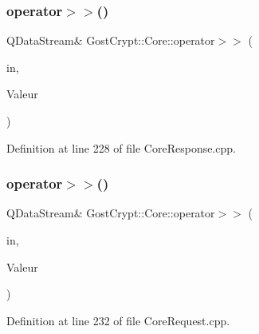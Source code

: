 \mbox{\label{namespace_gost_crypt_1_1_core_a9ba39e6dd3edd665d9cc31cf8c93b32d}} 
\subsubsection{\texorpdfstring{operator$>$$>$()}{operator>>()}\hspace{0.1cm}{\footnotesize\ttfamily [43/56]}}
{\footnotesize\ttfamily Q\+Data\+Stream\& Gost\+Crypt\+::\+Core\+::operator$>$$>$ (\begin{DoxyParamCaption}\item[{Q\+Data\+Stream \&}]{in,  }\item[{\hyperlink{struct_gost_crypt_1_1_core_1_1_benchmark_algorithms_response}{Benchmark\+Algorithms\+Response} \&}]{Valeur }\end{DoxyParamCaption})}



Definition at line 228 of file Core\+Response.\+cpp.

\mbox{\label{namespace_gost_crypt_1_1_core_aa0bb304100461cbdd2b32ba90bb6e594}} 
\subsubsection{\texorpdfstring{operator$>$$>$()}{operator>>()}\hspace{0.1cm}{\footnotesize\ttfamily [44/56]}}
{\footnotesize\ttfamily Q\+Data\+Stream\& Gost\+Crypt\+::\+Core\+::operator$>$$>$ (\begin{DoxyParamCaption}\item[{Q\+Data\+Stream \&}]{in,  }\item[{\hyperlink{struct_gost_crypt_1_1_core_1_1_get_encryption_algorithms_request}{Get\+Encryption\+Algorithms\+Request} \&}]{Valeur }\end{DoxyParamCaption})}



Definition at line 232 of file Core\+Request.\+cpp.

\mbox{\label{namespace_gost_crypt_1_1_core_a18a2f5fd0b2a079c8cbcbccd1177e312}} 
